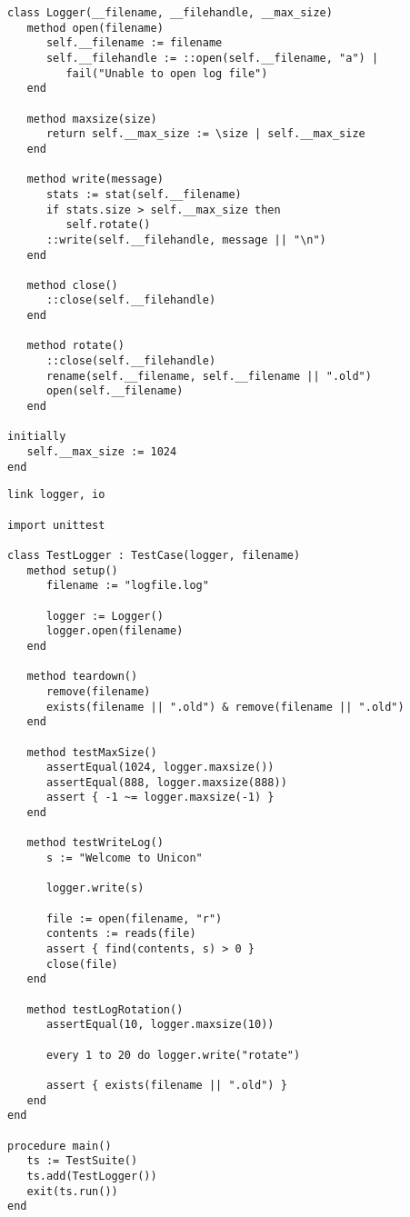 \documentclass[letterpaper,12pt]{article}
\begin{document}
\bigskip{}
\begin{verbatim}
class Logger(__filename, __filehandle, __max_size)
   method open(filename)
      self.__filename := filename
      self.__filehandle := ::open(self.__filename, "a") |
         fail("Unable to open log file")
   end

   method maxsize(size)
      return self.__max_size := \size | self.__max_size
   end

   method write(message)
      stats := stat(self.__filename)
      if stats.size > self.__max_size then
         self.rotate()
      ::write(self.__filehandle, message || "\n")
   end

   method close()
      ::close(self.__filehandle)
   end

   method rotate()
      ::close(self.__filehandle)
      rename(self.__filename, self.__filename || ".old")
      open(self.__filename)
   end

initially
   self.__max_size := 1024
end
\end{verbatim}

\bigskip{}
\begin{verbatim}
link logger, io

import unittest

class TestLogger : TestCase(logger, filename)
   method setup()
      filename := "logfile.log"

      logger := Logger()
      logger.open(filename)
   end

   method teardown()
      remove(filename)
      exists(filename || ".old") & remove(filename || ".old")
   end

   method testMaxSize()
      assertEqual(1024, logger.maxsize())
      assertEqual(888, logger.maxsize(888))
      assert { -1 ~= logger.maxsize(-1) }
   end

   method testWriteLog()
      s := "Welcome to Unicon"

      logger.write(s)

      file := open(filename, "r")
      contents := reads(file)
      assert { find(contents, s) > 0 }
      close(file)
   end

   method testLogRotation()
      assertEqual(10, logger.maxsize(10))

      every 1 to 20 do logger.write("rotate")

      assert { exists(filename || ".old") }
   end
end

procedure main()
   ts := TestSuite()
   ts.add(TestLogger())
   exit(ts.run())
end
\end{verbatim}
\end{document}
